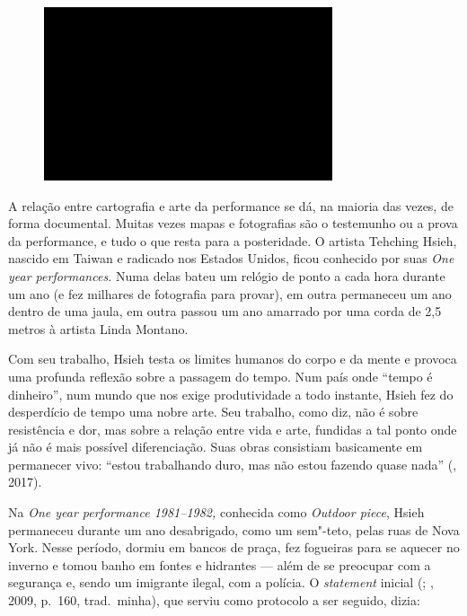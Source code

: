 \begin{figure}[!ht]

\centering
 \includegraphics[width=85mm]{./imgs/im1.jpg}
\caption{\tiny{}}

\end{figure}

A relação entre cartografia e arte da performance se dá, na maioria
das vezes, de forma documental. Muitas vezes mapas e fotografias são o
testemunho ou a prova da performance, e tudo o que resta para a
posteridade. O artista Tehching Hsieh, nascido em Taiwan e radicado nos
Estados Unidos, ficou conhecido por suas \emph{One year performances.}
Numa delas bateu um relógio de ponto a cada hora durante um ano (e fez
milhares de fotografia para provar), em outra permaneceu um ano dentro
de uma jaula, em outra passou um ano amarrado por uma corda de 2,5
metros à artista Linda Montano.

Com seu trabalho, Hsieh testa os limites humanos do corpo e da mente e
provoca uma profunda reflexão sobre a passagem do tempo. Num país onde
``tempo é dinheiro'', num mundo que nos exige produtividade a todo
instante, Hsieh fez do desperdício de tempo uma nobre arte. Seu
trabalho, como diz, não é sobre resistência e dor, mas sobre a relação
entre vida e arte, fundidas a tal ponto onde já não é mais possível
diferenciação. Suas obras consistiam basicamente em permanecer vivo:
``estou trabalhando duro, mas não estou fazendo quase nada'' (,
2017).

Na \emph{One year performance 1981--1982,} conhecida como \emph{Outdoor
piece}, Hsieh permaneceu durante um ano desabrigado, como um sem"-teto,
pelas ruas de Nova York. Nesse período, dormiu em bancos de praça, fez
fogueiras para se aquecer no inverno e tomou banho em fontes e hidrantes
--- além de se preocupar com a segurança e, sendo um imigrante ilegal,
com a polícia. O \emph{statement} inicial (; , 2009, p.~160, trad.~minha), que serviu como protocolo a ser seguido, dizia:

